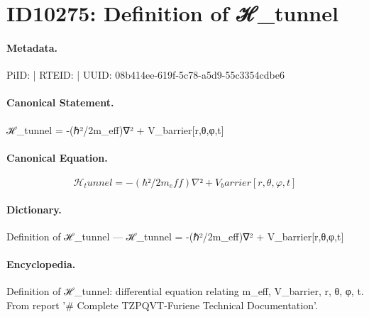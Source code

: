 \section*{ID10275: Definition of ℋ\_tunnel}
\paragraph{Metadata.}
PiID:  | RTEID:  | UUID: 08b414ee-619f-5c78-a5d9-55c3354cdbe6

\paragraph{Canonical Statement.}
ℋ\_tunnel = -(ℏ²/2m\_eff)∇² + V\_barrier[r,θ,φ,t]

\paragraph{Canonical Equation.}
\[
ℋ_tunnel = -(ℏ²/2m_eff)∇² + V_barrier[r,θ,φ,t]
\]

\paragraph{Dictionary.}
Definition of ℋ\_tunnel — ℋ\_tunnel = -(ℏ²/2m\_eff)∇² + V\_barrier[r,θ,φ,t]

\paragraph{Encyclopedia.}
Definition of ℋ\_tunnel: differential equation relating m\_eff, V\_barrier, r, θ, φ, t. From report '\# Complete TZPQVT-Furiene Technical Documentation'.
